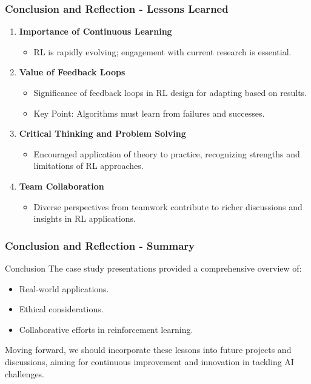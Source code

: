 \documentclass[aspectratio=169]{beamer}
\begin{document}
\begin{frame}[fragile]
    \frametitle{Conclusion and Reflection - Lessons Learned}

    \begin{enumerate}
        \item \textbf{Importance of Continuous Learning}
        \begin{itemize}
            \item RL is rapidly evolving; engagement with current research is essential.
        \end{itemize}

        \item \textbf{Value of Feedback Loops}
        \begin{itemize}
            \item Significance of feedback loops in RL design for adapting based on results.
            \item Key Point: Algorithms must learn from failures and successes.
        \end{itemize}

        \item \textbf{Critical Thinking and Problem Solving}
        \begin{itemize}
            \item Encouraged application of theory to practice, recognizing strengths and limitations of RL approaches.
        \end{itemize}

        \item \textbf{Team Collaboration}
        \begin{itemize}
            \item Diverse perspectives from teamwork contribute to richer discussions and insights in RL applications.
        \end{itemize}
    \end{enumerate}
\end{frame}

\begin{frame}[fragile]
    \frametitle{Conclusion and Reflection - Summary}

    \begin{block}{Conclusion}
        The case study presentations provided a comprehensive overview of:
        \begin{itemize}
            \item Real-world applications.
            \item Ethical considerations.
            \item Collaborative efforts in reinforcement learning.
        \end{itemize}
        Moving forward, we should incorporate these lessons into future projects and discussions, aiming for continuous improvement and innovation in tackling AI challenges.
    \end{block}
\end{frame}
\end{document}
